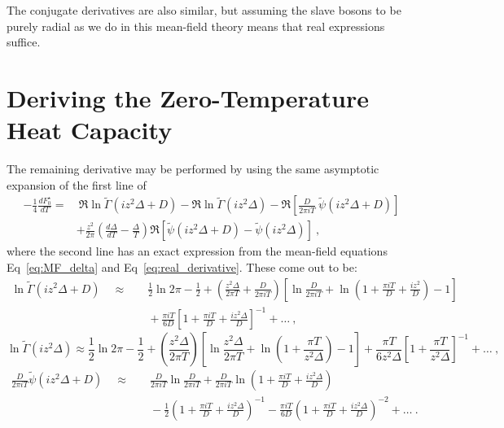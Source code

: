 The conjugate derivatives are also similar, but assuming the slave bosons to be purely radial as we do in this mean-field theory means that real expressions suffice.

\section{Deriving the Zero-Temperature Heat Capacity}
\label{sec:heat_capacity}

The remaining derivative may be performed by using the same asymptotic expansion of the first line of
\begin{align*}
- \frac{1}{4} \frac{d F_{0}^{\star}}{dT} =& ~ \Re \ln{\widetilde{\Gamma}(i z^2 \Delta + D)} - \Re \ln{\widetilde{\Gamma}(i z^2 \Delta)} - \Re{\left[ \frac{D}{2 \pi i T} ~ \widetilde{\psi}(i z^2 \Delta + D) \right]} \\
& + \frac{z^2}{2 \pi} \left( \frac{d \Delta}{d T} - \frac{\Delta}{T} \right) \Re{\left[ \widetilde{\psi}(i z^2 \Delta + D) - \widetilde{\psi}(i z^2 \Delta) \right]}~,
\end{align*}
where the second line has an exact expression from the mean-field equations Eq~\eqref{eq:MF_delta} and Eq~\eqref{eq:real_derivative}. These come out to be:
\begin{align*}
\ln{\widetilde{\Gamma}(i z^2 \Delta + D)} \quad \approx& \quad \frac{1}{2} \ln{2 \pi} - \frac{1}{2} + \left(\frac{z^2 \Delta}{2 \pi T} + \frac{D}{2 \pi i T}\right) \left[ \ln{\frac{D}{2 \pi i T}} + \ln{\left( 1 + \frac{\pi i T}{D} + \frac{i z^2}{D} \right)} - 1 \right]\\
& \quad + \frac{\pi i T}{6 D} \left[ 1 + \frac{\pi i T}{D} + \frac{i z^2 \Delta}{D} \right]^{-1} + \ldots ~,
\end{align*}
\begin{equation*}
\ln{\widetilde{\Gamma}(i z^2 \Delta)} \approx \frac{1}{2} \ln{2 \pi} - \frac{1}{2} + \left(\frac{z^2 \Delta}{2 \pi T}\right) \left[ \ln{\frac{z^2 \Delta}{2 \pi T}} + \ln{\left( 1 + \frac{\pi T}{z^2 \Delta} \right)} - 1 \right]+ \frac{\pi T}{6 z^2 \Delta} \left[ 1 + \frac{\pi T}{z^2 \Delta} \right]^{-1} + \ldots ~,
\end{equation*}
\begin{align*}
\frac{D}{2 \pi i T} \widetilde{\psi}(i z^2 \Delta + D) \quad \approx& \quad \frac{D}{2 \pi i T} \ln{\frac{D}{2 \pi i T}} + \frac{D}{2 \pi i T}
 \ln{\left( 1 + \frac{\pi i T}{D} + \frac{i z^2 \Delta}{D} \right)} \\
 & \quad - \frac{1}{2} \left( 1 + \frac{\pi i T}{D} + \frac{i z^2 \Delta}{D} \right)^{-1} - \frac{\pi i T}{6 D} \left( 1 + \frac{\pi i T}{D} + \frac{i z^2 \Delta}{D} \right)^{-2} + \ldots ~.
 \end{align*}

